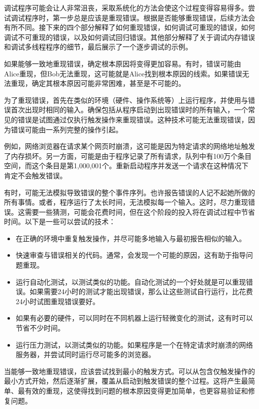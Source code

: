 
调试程序可能会让人非常沮丧，采取系统化的方法会使这个过程变得容易得多。尝试调试程序时，第一步总是应该是重现错误。根据是否能够重现错误，后续方法会有所不同。接下来的四个部分解释了如何重现错误，如何调试可重现的错误，如何调试不可重现的错误，以及如何调试回归错误。其他部分解释了关于调试内存错误和调试多线程程序的细节，最后展示了一个逐步调试的示例。


如果能够一致地重现错误，确定根本原因将变得更加容易。有时，错误可能由Alice重现，但Bob无法重现，这可能就是Alice找到根本原因的线索。如果错误无法重现，确定其根本原因可能非常困难，甚至是不可能的。

为了重现错误，首先在类似的环境（硬件、操作系统等）上运行程序，并使用与错误首次出现时相同的输入。确保包括从程序启动到出现错误时的所有输入，一个常见的错误是试图通过仅执行触发操作来重现错误。这种技术可能无法重现错误，因为错误可能由一系列完整的操作引起。

例如，网络浏览器在请求某个网页时崩溃，这可能是因为特定请求的网络地址触发了内存损坏。另一方面，可能是由于程序记录了所有请求，队列中有100万个条目空间，而这个条目是第1,000,001个。重新启动程序并发送一个请求在这种情况下肯定不会触发错误。

有时，可能无法模拟导致错误的整个事件序列。也许报告错误的人记不起她所做的所有事情。或者，程序运行了太长时间，无法模拟每一个输入。这时，尽力重现错误。这需要一些猜测，可能会花费时间，但在这个阶段的投入将在调试过程中节省时间。以下是一些可以尝试的技术：

\begin{itemize}
\item
在正确的环境中重复触发操作，并尽可能多地输入与最初报告相似的输入。

\item
快速审查与错误相关的代码。通常，会发现一个可能的原因，这有助于指导问题重现。

\item
运行自动化测试，以测试类似的功能。自动化测试的一个好处就是可以重现错误。如果需要24小时的测试才能出现错误，那么让这些测试自行运行，比花费24小时试图重现错误要好。

\item
如果有必要的硬件，可以同时在不同机器上运行轻微变化的测试，这有时可以节省不少时间。

\item
运行压力测试，以测试类似的功能。如果程序是一个在特定请求时崩溃的网络服务器，并尝试同时运行尽可能多的浏览器。
\end{itemize}

当能够一致地重现错误，应该尝试找到最小的触发方式。可以从包含仅触发操作的最小方式开始，然后逐渐扩展，覆盖从启动到触发错误的整个过程。这将产生最简单、最有效的重现，这使得找到问题的根本原因变得更加简单，也更容易验证和修复问题。

